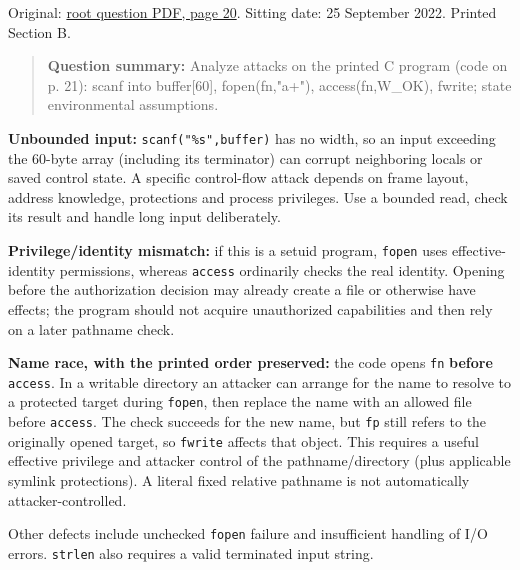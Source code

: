 \documentclass[11pt,a4paper]{article}
\begin{document}
Original: \href{../../CSE405-Security_Merged.pdf\#page=20}{root question PDF,\allowbreak{} page 20}. Sitting date: 25 September 2022. Printed Section B.



\begin{quote}\small

\textbf{Question summary:} Analyze attacks on the printed C program (code on p. 21): scanf into buffer[60],\allowbreak{} fopen(fn,\allowbreak{}"a+"),\allowbreak{} access(fn,\allowbreak{}W\_OK),\allowbreak{} fwrite; state environmental assumptions.



\end{quote}

\textbf{Unbounded input:} \texttt{scanf("\%s",\allowbreak{}buffer)} has no width,\allowbreak{} so an input exceeding the 60-byte array (including its terminator) can corrupt neighboring locals or saved control state. A specific control-flow attack depends on frame layout,\allowbreak{} address knowledge,\allowbreak{} protections and process privileges. Use a bounded read,\allowbreak{} check its result and handle long input deliberately.


\textbf{Privilege/\allowbreak{}identity mismatch:} if this is a setuid program,\allowbreak{} \texttt{fopen} uses effective-identity permissions,\allowbreak{} whereas \texttt{access} ordinarily checks the real identity. Opening before the authorization decision may already create a file or otherwise have effects; the program should not acquire unauthorized capabilities and then rely on a later pathname check.


\textbf{Name race,\allowbreak{} with the printed order preserved:} the code opens \texttt{fn} \textbf{before} \texttt{access}. In a writable directory an attacker can arrange for the name to resolve to a protected target during \texttt{fopen},\allowbreak{} then replace the name with an allowed file before \texttt{access}. The check succeeds for the new name,\allowbreak{} but \texttt{fp} still refers to the originally opened target,\allowbreak{} so \texttt{fwrite} affects that object. This requires a useful effective privilege and attacker control of the pathname/\allowbreak{}directory (plus applicable symlink protections). A literal fixed relative pathname is not automatically attacker-controlled.


Other defects include unchecked \texttt{fopen} failure and insufficient handling of I/\allowbreak{}O errors. \texttt{strlen} also requires a valid terminated input string.
\end{document}
